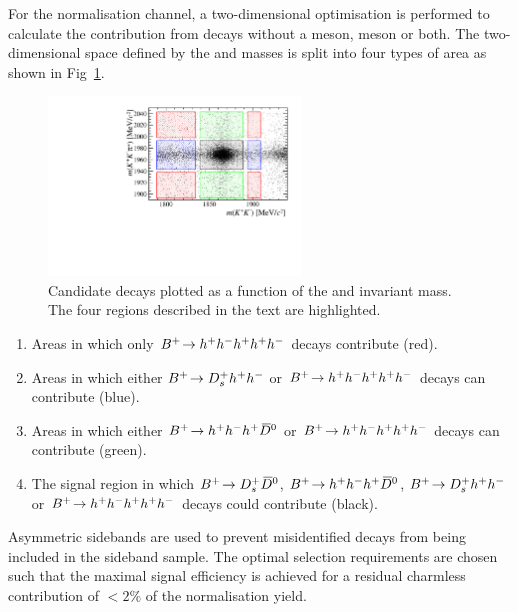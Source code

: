 

For the \decay{\Bp}{\Dsp\Dzb} normalisation channel, a two-dimensional optimisation is performed to calculate the contribution from decays without a \Dsp meson, \Dzb meson or both. 
The two-dimensional space defined by the \Dsp and \Dzb masses is split into four types of area as shown in Fig~\ref{fig:2d_normalisation}.

\begin{figure}[!h]
    \centering
        \includegraphics[width=0.6\textwidth]{figs/Selection/B2DsD0_2D_mass_Ds2KKPiRun2.pdf}
        \caption{Candidate \decay{\Bp}{\Dsp\Dzb} decays plotted as a function of the \Dsp and \Dzb invariant mass. The four regions described in the text are highlighted.}
    \label{fig:2d_normalisation}   
\end{figure}

\begin{enumerate}
\item Areas in which only ${{{B}^+}}\!\rightarrow h^{+}h^{-}h^{+}h^{+}h^{-}$ decays contribute (red).
\item Areas in which either ${{{B}^+}}\!\rightarrow D_{s}^{+}h^{+}h^{-}$  or ${{{B}^+}}\!\rightarrow h^{+}h^{-}h^{+} h^{+}h^{-}$ decays can contribute (blue). 

\item Areas in which either ${{{B}^+}}\!\rightarrow h^{+}h^{-}h^{+}{{\kern 0.2em\overline{\kern -0.2em D}{}}{}^0}$ or ${{{B}^+}}\!\rightarrow h^{+}h^{-}h^{+} h^{+}h^{-}$ decays can contribute (green). 
\item The signal region in which ${{{B}^+}}\!\rightarrow D_{s}^{+} {{\kern 0.2em\overline{\kern -0.2em D}{}}{}^0}$, ${{{B}^+}}\!\rightarrow h^{+}h^{-}h^{+}{{\kern 0.2em\overline{\kern -0.2em D}{}}{}^0}$, ${{{B}^+}}\!\rightarrow D_{s}^{+}h^{+}h^{-}$ or ${{{B}^+}}\!\rightarrow h^{+}h^{-}h^{+}h^{+}h^{-}$ decays could contribute (black).
\end{enumerate}   

Asymmetric \Dzb sidebands are used to prevent misidentified \decay{\Bp}{\Dsp (\decay{\Dzb}{\Km\pip})} decays from being included in the sideband sample.
The optimal selection requirements are chosen such that the maximal signal efficiency is achieved for a residual charmless contribution of $<2\%$ of the normalisation yield.

